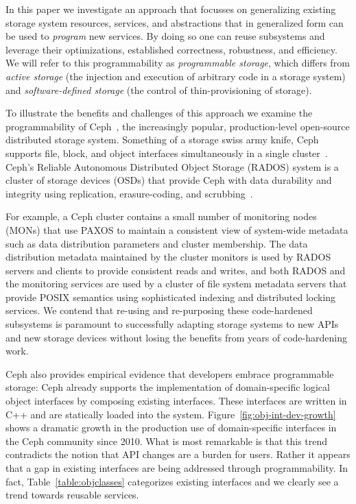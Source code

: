 \documentclass[10pt,twocolumn]{article}
\begin{document}
In this paper we investigate an approach that focusses on generalizing
existing storage system resources, services, and abstractions that in
generalized form can be used to \emph{program} new services. By doing so
one can reuse subsystems and leverage their optimizations,
established correctness, robustness, and efficiency. We will refer to
this programmability as \emph{programmable storage}, which differs from
\emph{active storage} (the injection and execution of arbitrary code in
a storage system) and \emph{software-defined storage} (the control of
thin-provisioning of storage).

To illustrate the benefits and challenges of this approach we examine
the programmability of Ceph~\cite{weil:osdi2006-ceph,ceph}, the increasingly
popular, production-level open-source distributed storage system.
Something of a storage swiss army knife, Ceph supports file, block, and
object interfaces simultaneously in a single cluster~\cite{ceph_contributors_ceph_2010}. Ceph's Reliable Autonomous 
Distributed Object Storage (RADOS) system is a cluster of storage
devices (OSDs) that provide Ceph with data durability and integrity
using replication, erasure-coding, and scrubbing~\cite{weil_rados_2007}. 

For example, a Ceph cluster contains a small number of
monitoring nodes (MONs) that use PAXOS to maintain a consistent view of
system-wide metadata such as data distribution parameters and cluster
membership. The data distribution metadata maintained by
the cluster monitors is used by RADOS servers and clients to provide
consistent reads and writes, and both RADOS and the monitoring services
are used by a cluster of file system metadata servers that provide POSIX
semantics using sophisticated indexing and distributed locking services.
We contend that re-using and re-purposing these code-hardened subsystems
is paramount to successfully adapting storage systems to new APIs and
new storage devices without losing the benefits from years of
code-hardening work.
\fi

Ceph also provides empirical evidence that developers embrace programmable storage: Ceph already supports the
implementation of domain-specific logical object interfaces by composing
existing interfaces. These interfaces are written in C++ and are statically
loaded into the system. Figure~\ref{fig:obj-int-dev-growth} shows a dramatic growth in the production use of
domain-specific interfaces in the Ceph community since 2010.  What is most
remarkable is that this trend contradicts the notion that API changes are a
burden for users.
Rather it appears that a gap in existing interfaces are
being addressed through programmability. In fact, Table~\ref{table:objclasses}
categorizes existing interfaces and we clearly see a trend towards reusable
services.
\end{document}
